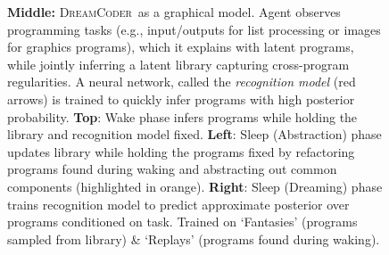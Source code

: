 \documentclass{article}
\newcommand{\system}{\textsc{DreamCoder}~}
\newcommand{\probability}{\mathds{P}} %
\newtheorem{definition}{Definition}
\begin{document}
\begin{figure}
\begin{tikzpicture}[line width=0.4mm]
  \end{tikzpicture}
  \caption{\textbf{Middle:} \system as a graphical model. Agent observes programming tasks (e.g., input/outputs for list processing or images for graphics programs), which it explains with latent programs, while jointly inferring a latent library capturing cross-program regularities. A neural network, called the \emph{recognition model} (red arrows) is trained to quickly infer programs with high posterior probability. \textbf{Top}: Wake phase infers programs while holding the library and recognition model fixed. \textbf{Left}: Sleep (Abstraction) phase updates library while holding the programs fixed by refactoring programs found during waking and abstracting out common components (highlighted in orange). \textbf{Right}: Sleep (Dreaming) phase trains recognition model to predict approximate posterior over programs conditioned on task. Trained on `Fantasies' (programs sampled from library) \& `Replays' (programs found during waking).}\label{threeCycles}
\end{figure}



\end{document}
